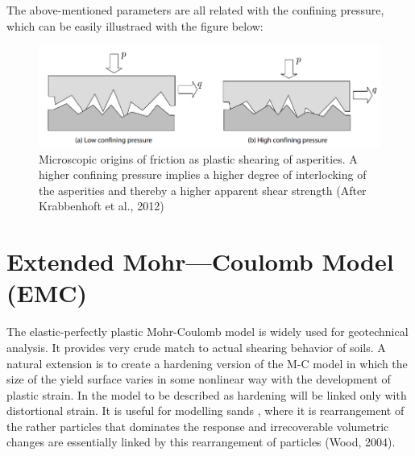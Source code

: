 \documentclass[a4paper, nobind]{templates/ociamthesis}
\begin{document}
The above-mentioned parameters are all related with the confining pressure, which can be easily illustraed with the figure below:

\begin{figure}[H]
\includegraphics[width=1\linewidth]{myfigureeeeee/confiningpressure} \caption{Microscopic origins of friction as plastic shearing of asperities. A higher confining pressure implies a higher degree of interlocking of the asperities and thereby a higher apparent shear strength (After  Krabbenhoft et al., 2012)}\label{fig:unnamed-chunk-3}
\end{figure}

\hypertarget{extended-mohrcoulomb-model-emc}{%
\section{Extended Mohr---Coulomb Model (EMC)}\label{extended-mohrcoulomb-model-emc}}

The elastic-perfectly plastic Mohr-Coulomb model is widely used for geotechnical analysis. It provides very crude match to actual shearing behavior of soils. A natural extension is to create a hardening version of the M-C model in which the size of the yield surface varies in some nonlinear way with the development of plastic strain. In the model to be described as hardening will be linked only with distortional strain. It is useful for modelling sands , where it is rearrangement of the rather particles that dominates the response and irrecoverable volumetric changes are essentially linked by this rearrangement of particles (Wood, 2004).
\end{document}

